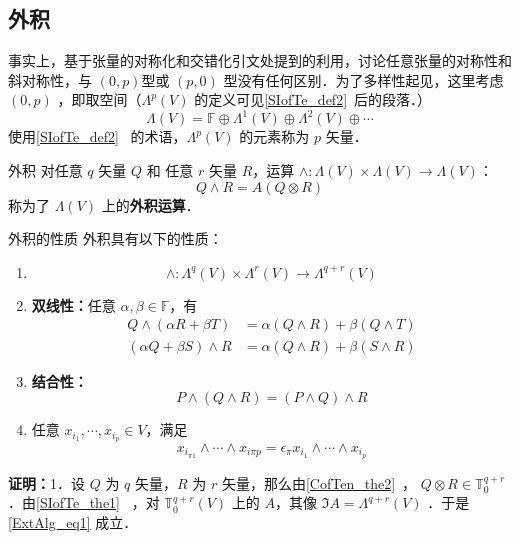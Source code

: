 \subsection{外积}
事实上，基于张量的对称化和交错化引文处提到的利用，讨论任意张量的对称性和斜对称性，与 $(0,p)$型或 $(p,0)$ 型没有任何区别．为了多样性起见，这里考虑 $(0,p)$ ，即取空间（$\Lambda^p(V)$ 的定义可见\autoref{SIofTe_def2}~后的段落．） 
\begin{equation}
\Lambda(V)=\mathbb F\oplus \Lambda^1(V)\oplus\Lambda^2(V)\oplus\cdots
\end{equation}
使用\autoref{SIofTe_def2}~ 的术语，$\Lambda^p(V)$ 的元素称为 $p$ 矢量．
\begin{definition}{外积}
对任意 $q$ 矢量 $Q$ 和 任意 $r$ 矢量 $R$，运算 $\wedge:\Lambda(V)\times\Lambda(V)\rightarrow\Lambda(V)$：
\begin{equation}
Q\wedge R=A(Q\otimes R)
\end{equation}
称为了 $\Lambda(V)$ 上的\textbf{外积运算}．
\end{definition}
\begin{theorem}{外积的性质}
外积具有以下的性质：
\begin{enumerate}
\item \begin{equation}\label{ExtAlg_eq1}
\wedge:\Lambda^q(V)\times\Lambda^r(V)\rightarrow\Lambda^{q+r}(V)
\end{equation}
\item \textbf{双线性：}任意 $\alpha,\beta\in\mathbb F$，有
\begin{equation}
\begin{aligned}
Q\wedge(\alpha R+\beta T)&=\alpha(Q\wedge R)+\beta(Q\wedge T)\\
(\alpha Q+\beta S)\wedge R&=\alpha (Q\wedge R)+\beta (S\wedge R)
\end{aligned}
\end{equation}
\item \textbf{结合性：}
\begin{equation}
P\wedge (Q\wedge R)=(P\wedge Q)\wedge R
\end{equation}
\item 任意 $x_{i_1},\cdots,x_{i_p}\in V$，满足
\begin{equation}
x_{i_{\pi 1}}\wedge\cdots \wedge x_{i\pi p}=\epsilon_\pi x_{i_1}\wedge\cdots\wedge x_{i_p}
\end{equation}

\end{enumerate}

\end{theorem}
\textbf{证明：}1．设 $Q$ 为 $q$ 矢量，$R$ 为 $r$ 矢量，那么由\autoref{CofTen_the2}~， $Q\otimes R\in\mathbb T_0^{q+r}$ ．由\autoref{SIofTe_the1}~ ，对 $\mathbb T_0^{q+r}(V)$ 上的 $A$，其像 $\Im A=\Lambda ^{q+r}(V)$ ．于是\autoref{ExtAlg_eq1} 成立．


